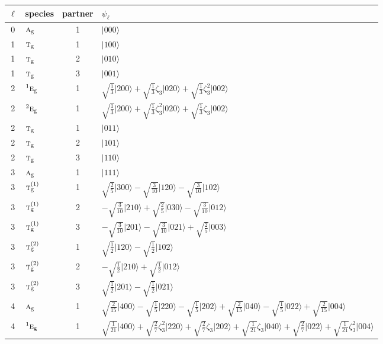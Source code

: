 \documentclass[11pt]{article}
\newcommand{\irr}[1]{\text{\normalfont\scshape #1}}
\newcommand{\conjpair}[1]{{}^{#1}}
\newcommand{\ptag}[1]{\mathrm{#1}}
\newcommand{\rootunity}[1]{\zeta_{#1}}
\newcommand{\occ}[1]{\lvert #1\rangle}
\begin{document}
\begin{longtable}{c l c p{}}\hline $\ell$ & species & partner & $\psi_\ell$\\ \hline\endhead
0 & $\irr{a}_{\ptag{g}}$ & 1 & $\occ{000}$\\
\hline
1 & $\irr{t}_{\ptag{g}}$ & 1 & $\occ{100}$\\
1 & $\irr{t}_{\ptag{g}}$ & 2 & $\occ{010}$\\
1 & $\irr{t}_{\ptag{g}}$ & 3 & $\occ{001}$\\
\hline
2 & $\conjpair{1}\irr{e}_{\ptag{g}}$ & 1 & $\sqrt{\tfrac{1}{3}}\occ{200}+\sqrt{\tfrac{1}{3}}\rootunity{3}\occ{020}+\sqrt{\tfrac{1}{3}}\rootunity{3}^{2}\occ{002}$\\
2 & $\conjpair{2}\irr{e}_{\ptag{g}}$ & 1 & $\sqrt{\tfrac{1}{3}}\occ{200}+\sqrt{\tfrac{1}{3}}\rootunity{3}^{2}\occ{020}+\sqrt{\tfrac{1}{3}}\rootunity{3}\occ{002}$\\
2 & $\irr{t}_{\ptag{g}}$ & 1 & $\occ{011}$\\
2 & $\irr{t}_{\ptag{g}}$ & 2 & $\occ{101}$\\
2 & $\irr{t}_{\ptag{g}}$ & 3 & $\occ{110}$\\
\hline
3 & $\irr{a}_{\ptag{g}}$ & 1 & $\occ{111}$\\
3 & $\irr{t}_{\ptag{g}}^{(1)}$ & 1 & $\sqrt{\tfrac{2}{5}}\occ{300}-\sqrt{\tfrac{3}{10}}\occ{120}-\sqrt{\tfrac{3}{10}}\occ{102}$\\
3 & $\irr{t}_{\ptag{g}}^{(1)}$ & 2 & $-\sqrt{\tfrac{3}{10}}\occ{210}+\sqrt{\tfrac{2}{5}}\occ{030}-\sqrt{\tfrac{3}{10}}\occ{012}$\\
3 & $\irr{t}_{\ptag{g}}^{(1)}$ & 3 & $-\sqrt{\tfrac{3}{10}}\occ{201}-\sqrt{\tfrac{3}{10}}\occ{021}+\sqrt{\tfrac{2}{5}}\occ{003}$\\
3 & $\irr{t}_{\ptag{g}}^{(2)}$ & 1 & $\sqrt{\tfrac{1}{2}}\occ{120}-\sqrt{\tfrac{1}{2}}\occ{102}$\\
3 & $\irr{t}_{\ptag{g}}^{(2)}$ & 2 & $-\sqrt{\tfrac{1}{2}}\occ{210}+\sqrt{\tfrac{1}{2}}\occ{012}$\\
3 & $\irr{t}_{\ptag{g}}^{(2)}$ & 3 & $\sqrt{\tfrac{1}{2}}\occ{201}-\sqrt{\tfrac{1}{2}}\occ{021}$\\
\hline
4 & $\irr{a}_{\ptag{g}}$ & 1 & $\sqrt{\tfrac{2}{15}}\occ{400}-\sqrt{\tfrac{1}{5}}\occ{220}-\sqrt{\tfrac{1}{5}}\occ{202}+\sqrt{\tfrac{2}{15}}\occ{040}-\sqrt{\tfrac{1}{5}}\occ{022}+\sqrt{\tfrac{2}{15}}\occ{004}$\\
4 & $\conjpair{1}\irr{e}_{\ptag{g}}$ & 1 & $\sqrt{\tfrac{1}{21}}\occ{400}+\sqrt{\tfrac{2}{7}}\rootunity{3}^{2}\occ{220}+\sqrt{\tfrac{2}{7}}\rootunity{3}\occ{202}+\sqrt{\tfrac{1}{21}}\rootunity{3}\occ{040}+\sqrt{\tfrac{2}{7}}\occ{022}+\sqrt{\tfrac{1}{21}}\rootunity{3}^{2}\occ{004}$\\

\end{longtable}
\end{document}
